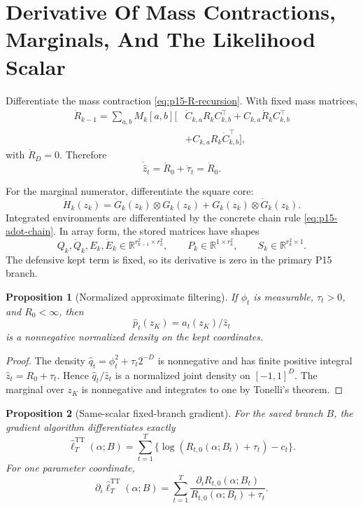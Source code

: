 \documentclass[11pt]{article}
\newcommand{\R}{\mathbb{R}}
\newcommand{\TT}{\mathrm{TT}}
\newtheorem{proposition}{Proposition}
\theoremstyle{definition}
\theoremstyle{remark}
\renewcommand{\[}{\begin{equation}}
\renewcommand{\]}{\end{equation}}
\begin{document}
\section{Derivative Of Mass Contractions, Marginals, And The Likelihood Scalar}

Differentiate the mass contraction \eqref{eq:p15-R-recursion}.  With fixed
mass matrices,
\[
\begin{aligned}
  \dot R_{k-1}
  =
  \sum_{a,b}M_k[a,b]\Big[
  &\dot C_{k,a}R_kC_{k,b}^{\top}
  +C_{k,a}\dot R_kC_{k,b}^{\top}  \\
  &+C_{k,a}R_k\dot C_{k,b}^{\top}
  \Big],
\end{aligned}
  \label{eq:p15-Rdot}
\]
with \(\dot R_D=0\).  Therefore
\[
  \dot{\widehat z}_t=\dot R_0+\dot\tau_t=\dot R_0.
  \label{eq:p15-zdot}
\]

For the marginal numerator, differentiate the square core:
\[
  \dot H_k(z_k)=\dot G_k(z_k)\otimes G_k(z_k)+G_k(z_k)\otimes \dot G_k(z_k).
  \label{eq:p15-Hdot}
\]
Integrated environments are differentiated by the concrete chain rule
\eqref{eq:p15-adot-chain}.  In array form, the stored matrices have shapes
\[
  Q_k,\dot Q_k,E_k,\dot E_k
  \in
  \R^{r_{k-1}^2\times r_k^2},
  \qquad
  P_k\in\R^{1\times r_k^2},
  \qquad
  S_k\in\R^{r_k^2\times1}.
  \label{eq:p15-env-shapes}
\]
The defensive kept term is fixed, so its derivative is zero in the primary P15
branch.

\begin{proposition}[Normalized approximate filtering]
If \(\phi_t\) is measurable, \(\tau_t>0\), and \(R_0<\infty\), then
\[
  \widehat p_t(z_K)=a_t(z_K)/\widehat z_t
\]
is a nonnegative normalized density on the kept coordinates.
\end{proposition}

\begin{proof}
The density \(\widehat q_t=\phi_t^2+\tau_t2^{-D}\) is nonnegative and has
finite positive integral \(\widehat z_t=R_0+\tau_t\).  Hence
\(\widehat q_t/\widehat z_t\) is a normalized joint density on
\([-1,1]^D\).  The marginal over \(z_K\) is nonnegative and integrates to one
by Tonelli's theorem.
\end{proof}

\begin{proposition}[Same-scalar fixed-branch gradient]
For the saved branch \(B\), the gradient algorithm differentiates exactly
\[
  \widehat\ell_T^{\TT}(\alpha;B)
  =
  \sum_{t=1}^T
  \{\log(R_{t,0}(\alpha;B_t)+\tau_t)-c_t\}.
\]
For one parameter coordinate,
\[
  \partial_i\widehat\ell_T^{\TT}(\alpha;B)
  =
  \sum_{t=1}^T
  \frac{\partial_iR_{t,0}(\alpha;B_t)}
       {R_{t,0}(\alpha;B_t)+\tau_t}.
  \label{eq:p15-final-gradient}
\]
\end{proposition}
\end{document}
